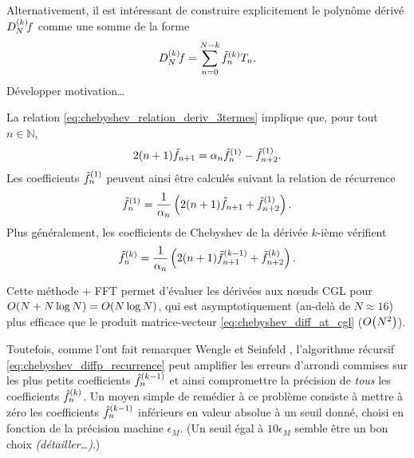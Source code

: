 Alternativement, il est intéressant de construire explicitement le polynôme dérivé $\interpderiv{f}{N}{k}$ comme une somme de la forme 
\begin{equation}
	\interpderiv{f}{N}{k} = \sum_{n=0}^{N-k} \deriv{\tilde{f}}{k}_n T_n.
\end{equation} 
Développer motivation\ldots
\par
La relation \eqref{eq:chebyshev_relation_deriv_3termes} implique que, pour tout $n \in \mathbb{N}$,
\begin{equation}
	2 (n + 1) \tilde{f}_{n+1} = \alpha_n \deriv{\tilde{f}}{1}_n - \deriv{\tilde{f}}{1}_{n+2}.
	\label{eq:chebyshev_prim_recurrence}
\end{equation}
Les coefficients $\deriv{\tilde{f}}{1}_n$ peuvent ainsi être calculés suivant la relation de récurrence
\begin{equation}
	\deriv{\tilde{f}}{1}_n = 
	\frac{1}{\alpha_n} \left( 2 (n + 1) \tilde{f}_{n+1} + \deriv{\tilde{f}}{1}_{n+2} \right).
	\label{eq:chebyshev_diff_recurrence}
\end{equation}
Plus généralement, les coefficients de Chebyshev de la dérivée $k$-ième vérifient
\begin{equation}
	\deriv{\tilde{f}}{k}_n = 
	\frac{1}{\alpha_n} \left( 2 (n + 1) \deriv{\tilde{f}}{k-1}_{n+1} + \deriv{\tilde{f}}{k}_{n+2} \right).
	\label{eq:chebyshev_diffp_recurrence}
\end{equation}

Cette méthode + FFT permet d'évaluer les dérivées aux n\oe uds CGL pour $\bigO{N + N \log N} = \bigO{N \log N}$, qui est asymptotiquement (au-delà de $N \approx 16$) plus efficace que le produit matrice-vecteur \eqref{eq:chebyshev_diff_at_cgl} ($\bigO{N^2}$).
\par
Toutefois, comme l'ont fait remarquer Wengle et Seinfeld \cite{wengle1978}, l'algorithme récursif \eqref{eq:chebyshev_diffp_recurrence} peut amplifier les erreurs d'arrondi commises sur les plus petits coefficients $\deriv{\hat{f}}{k-1}_{n}$ et ainsi compromettre la précision de \emph{tous} les coefficients $\deriv{\hat{f}}{k}_{n}$. 
Un moyen simple de remédier à ce problème consiste à mettre à zéro les coefficients $\deriv{\hat{f}}{k-1}_{n}$ inférieurs en valeur absolue à un seuil donné, choisi en fonction de la précision machine $\epsilon_M$. 
(Un seuil égal à $10 \epsilon_M$ semble être un bon choix \textit{(détailler\ldots)}.)

